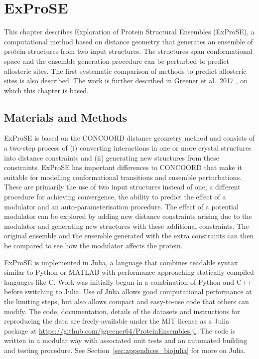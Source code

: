 \chapter{ExProSE}
\label{cha:exprose}

This chapter describes Exploration of Protein Structural Ensembles (ExProSE), a computational method based on distance geometry that generates an ensemble of protein structures from two input structures.
The structures span conformational space and the ensemble generation procedure can be perturbed to predict allosteric sites.
The first systematic comparison of methods to predict allosteric sites is also described.
The work is further described in Greener et al.\ 2017 \cite{Greener2017}, on which this chapter is based.


\section{Materials and Methods}
\label{sec:exprose_methods}

ExProSE is based on the CONCOORD distance geometry method \cite{DeGroot1997} and consists of a two-step process of (i) converting interactions in one or more crystal structures into distance constraints and (ii) generating new structures from these constraints.
ExProSE has important differences to CONCOORD that make it suitable for modelling conformational transitions and ensemble perturbations.
These are primarily the use of two input structures instead of one, a different procedure for achieving convergence, the ability to predict the effect of a modulator and an auto-parameterisation procedure.
The effect of a potential modulator can be explored by adding new distance constraints arising due to the modulator and generating new structures with these additional constraints. The original ensemble and the ensemble generated with the extra constraints can then be compared to see how the modulator affects the protein.

ExProSE is implemented in Julia, a language that combines readable syntax similar to Python or MATLAB with performance approaching statically-compiled languages like C.
Work was initially begun in a combination of Python and C++ before switching to Julia.
Use of Julia allows good computational performance at the limiting steps, but also allows compact and easy-to-use code that others can modify.
The code, documentation, details of the datasets and instructions for reproducing the data are freely-available under the MIT license as a Julia package at \url{https://github.com/jgreener64/ProteinEnsembles.jl}.
The code is written in a modular way with associated unit tests and an automated building and testing procedure.
See Section~\ref{sec:appendices_biojulia} for more on Julia.


